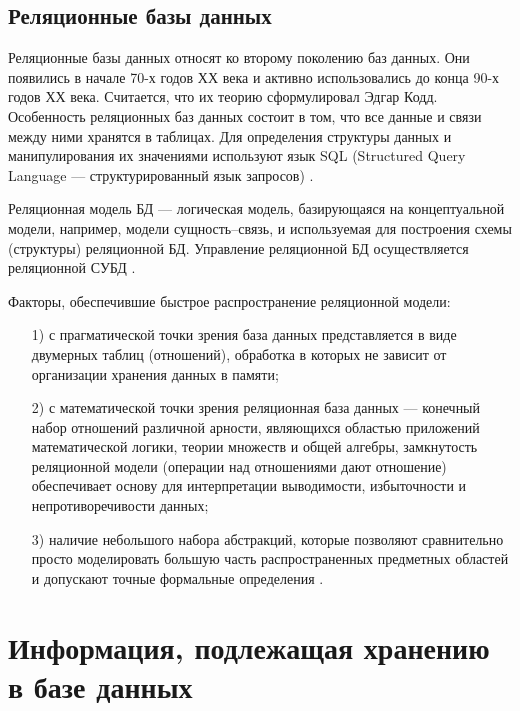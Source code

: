 \documentclass{bmstu}
\begin{document}
\subsection{Реляционные базы данных}

Реляционные базы данных относят ко второму поколению баз данных. 
Они появились в начале 70-х годов ХХ века и активно использовались до конца 90-х годов ХХ века. 
Считается, что их теорию сформулировал Эдгар Кодд. 
Особенность реляционных баз данных состоит в том, что все данные и связи между ними хранятся в таблицах. 
Для определения структуры данных и манипулирования их значениями используют язык SQL (Structured Query Language --- структурированный язык запросов) \cite{Vinogradov2016}.

Реляционная модель БД --- логическая модель, базирующаяся на концептуальной модели, например, модели сущность–связь, и используемая для построения схемы (структуры) реляционной БД. 
Управление реляционной БД осуществляется реляционной СУБД \cite{Vinogradov2016}.

Факторы, обеспечившие быстрое распространение реляционной
модели:

\begin{enumerate}
\item[1)] с прагматической точки зрения база данных представляется в виде двумерных таблиц (отношений), обработка в которых не зависит от организации хранения данных в памяти;
\item[2)] с математической точки зрения реляционная база данных --- конечный набор отношений различной арности, являющихся областью приложений математической логики, теории множеств и общей алгебры, замкнутость реляционной модели (операции над отношениями дают отношение) обеспечивает основу для интерпретации выводимости, избыточности и непротиворечивости данных;
\item[3)] наличие небольшого набора абстракций, которые позволяют сравнительно просто моделировать большую часть распространенных предметных областей и допускают точные формальные определения \cite{Avrunev2018}.
\end{enumerate}

\section{Информация, подлежащая хранению в базе данных}
\end{document}
